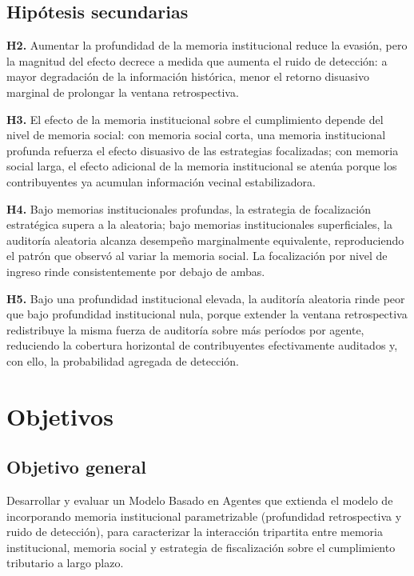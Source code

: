 \subsection{Hipótesis secundarias}
\label{sec:h2-secundarias}

\textbf{H2.} Aumentar la profundidad de la memoria institucional reduce la evasión, pero la magnitud del efecto decrece a medida que aumenta el ruido de detección: a mayor degradación de la información histórica, menor el retorno disuasivo marginal de prolongar la ventana retrospectiva.

\textbf{H3.} El efecto de la memoria institucional sobre el cumplimiento depende del nivel de memoria social: con memoria social corta, una memoria institucional profunda refuerza el efecto disuasivo de las estrategias focalizadas; con memoria social larga, el efecto adicional de la memoria institucional se atenúa porque los contribuyentes ya acumulan información vecinal estabilizadora.

\textbf{H4.} Bajo memorias institucionales profundas, la estrategia de focalización estratégica supera a la aleatoria; bajo memorias institucionales superficiales, la auditoría aleatoria alcanza desempeño marginalmente equivalente, reproduciendo el patrón que \textcite{canessa2025tax} observó al variar la memoria social. La focalización por nivel de ingreso rinde consistentemente por debajo de ambas.

\textbf{H5.} Bajo una profundidad institucional elevada, la auditoría aleatoria rinde peor que bajo profundidad institucional nula, porque extender la ventana retrospectiva redistribuye la misma fuerza de auditoría sobre más períodos por agente, reduciendo la cobertura horizontal de contribuyentes efectivamente auditados y, con ello, la probabilidad agregada de detección.

\section{Objetivos}
\label{sec:objetivos}

\subsection{Objetivo general}
\label{sec:obj-general}

Desarrollar y evaluar un Modelo Basado en Agentes que extienda el modelo de \textcite{canessa2025tax} incorporando memoria institucional parametrizable (profundidad retrospectiva y ruido de detección), para caracterizar la interacción tripartita entre memoria institucional, memoria social y estrategia de fiscalización sobre el cumplimiento tributario a largo plazo.

